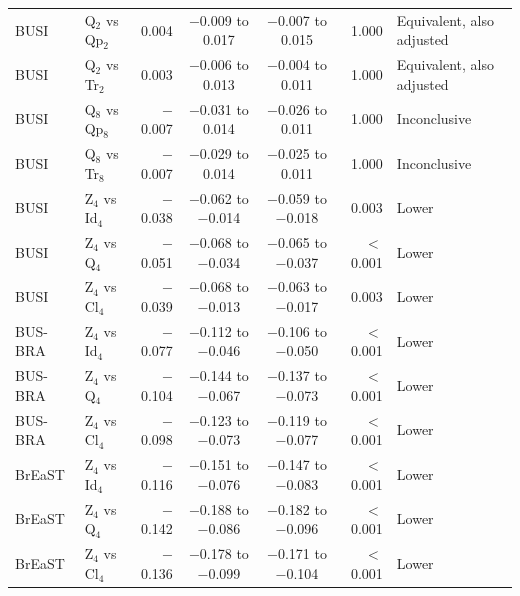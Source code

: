 \begin{table}[!ht]
\begin{tabular}{@{}llrccrl@{}}
BUSI & Q$_2$ vs Qp$_2$ & 0.004 & $-$0.009 to 0.017 & $-$0.007 to 0.015 & 1.000 & Equivalent, also adjusted \\
BUSI & Q$_2$ vs Tr$_2$ & 0.003 & $-$0.006 to 0.013 & $-$0.004 to 0.011 & 1.000 & Equivalent, also adjusted \\
BUSI & Q$_8$ vs Qp$_8$ & $-$0.007 & $-$0.031 to 0.014 & $-$0.026 to 0.011 & 1.000 & Inconclusive \\
BUSI & Q$_8$ vs Tr$_8$ & $-$0.007 & $-$0.029 to 0.014 & $-$0.025 to 0.011 & 1.000 & Inconclusive \\
\midrule
BUSI & Z$_4$ vs Id$_4$ & $-$0.038 & $-$0.062 to $-$0.014 & $-$0.059 to $-$0.018 & 0.003 & Lower \\
BUSI & Z$_4$ vs Q$_4$ & $-$0.051 & $-$0.068 to $-$0.034 & $-$0.065 to $-$0.037 & $<$0.001 & Lower \\
BUSI & Z$_4$ vs Cl$_4$ & $-$0.039 & $-$0.068 to $-$0.013 & $-$0.063 to $-$0.017 & 0.003 & Lower \\
BUS-BRA & Z$_4$ vs Id$_4$ & $-$0.077 & $-$0.112 to $-$0.046 & $-$0.106 to $-$0.050 & $<$0.001 & Lower \\
BUS-BRA & Z$_4$ vs Q$_4$ & $-$0.104 & $-$0.144 to $-$0.067 & $-$0.137 to $-$0.073 & $<$0.001 & Lower \\
BUS-BRA & Z$_4$ vs Cl$_4$ & $-$0.098 & $-$0.123 to $-$0.073 & $-$0.119 to $-$0.077 & $<$0.001 & Lower \\
BrEaST & Z$_4$ vs Id$_4$ & $-$0.116 & $-$0.151 to $-$0.076 & $-$0.147 to $-$0.083 & $<$0.001 & Lower \\
BrEaST & Z$_4$ vs Q$_4$ & $-$0.142 & $-$0.188 to $-$0.086 & $-$0.182 to $-$0.096 & $<$0.001 & Lower \\
BrEaST & Z$_4$ vs Cl$_4$ & $-$0.136 & $-$0.178 to $-$0.099 & $-$0.171 to $-$0.104 & $<$0.001 & Lower \\
\bottomrule
\end{tabular}
\end{table}
